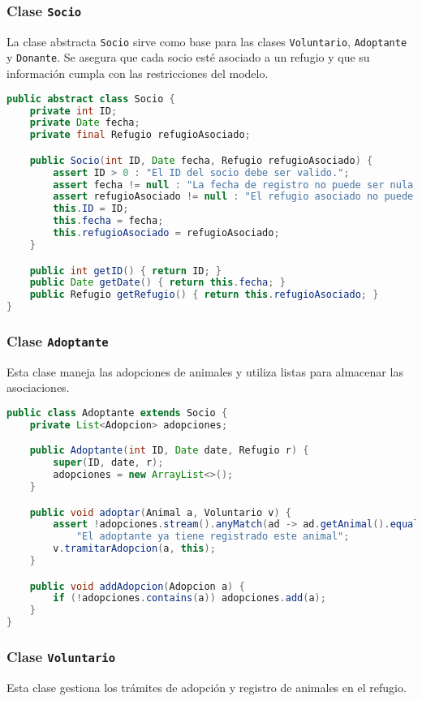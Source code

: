 \subsubsection{Clase \texttt{Socio}}
La clase abstracta \texttt{Socio} sirve como base para las clases \texttt{Voluntario}, \texttt{Adoptante} y \texttt{Donante}. Se asegura que cada socio esté asociado a un refugio y que su información cumpla con las restricciones del modelo.

\begin{lstlisting}[language=Java]
public abstract class Socio {
    private int ID;
    private Date fecha;
    private final Refugio refugioAsociado;

    public Socio(int ID, Date fecha, Refugio refugioAsociado) {
        assert ID > 0 : "El ID del socio debe ser valido.";
        assert fecha != null : "La fecha de registro no puede ser nula.";
        assert refugioAsociado != null : "El refugio asociado no puede ser nulo.";
        this.ID = ID;
        this.fecha = fecha;
        this.refugioAsociado = refugioAsociado;
    }

    public int getID() { return ID; }
    public Date getDate() { return this.fecha; }
    public Refugio getRefugio() { return this.refugioAsociado; }
}
\end{lstlisting}

\subsubsection{Clase \texttt{Adoptante}}
Esta clase maneja las adopciones de animales y utiliza listas para almacenar las asociaciones.

\begin{lstlisting}[language=Java]
public class Adoptante extends Socio {
    private List<Adopcion> adopciones;

    public Adoptante(int ID, Date date, Refugio r) {
        super(ID, date, r);
        adopciones = new ArrayList<>();
    }

    public void adoptar(Animal a, Voluntario v) {
        assert !adopciones.stream().anyMatch(ad -> ad.getAnimal().equals(a)) :
            "El adoptante ya tiene registrado este animal";
        v.tramitarAdopcion(a, this);
    }

    public void addAdopcion(Adopcion a) {
        if (!adopciones.contains(a)) adopciones.add(a);
    }
}
\end{lstlisting}

\subsubsection{Clase \texttt{Voluntario}}
Esta clase gestiona los trámites de adopción y registro de animales en el refugio.

